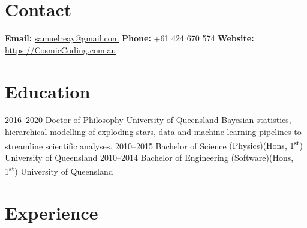 \documentclass[11pt]{friggeri-cv}
\begin{document}
\pagestyle{plain}


\section{Contact}

\textbf{Email: } \href{samuelreay@gmail.com}{samuelreay@gmail.com}   \hspace{1mm}
\textbf{Phone: } +61 424 670 574      \hspace{1mm}
\textbf{Website: } \href{https://cosmiccoding.com.au}{https://CosmicCoding.com.au}   



\section{Education}

\begin{entrylist}
\entry
{2016--2020}
{Doctor of Philosophy}
{University of Queensland}
{Bayesian statistics, hierarchical modelling of exploding stars, data and machine learning pipelines to streamline scientific analyses.}
\entrysmall
{2010--2015}
{Bachelor of Science {\normalfont (Physics)(Hons, 1\textsuperscript{st})}}
{University of Queensland}
{}%
\entrysmall
{2010--2014}
{Bachelor of Engineering {\normalfont (Software)(Hons, 1\textsuperscript{st})}}
{University of Queensland}
{}%
\end{entrylist}



\section{Experience}
\end{document}
